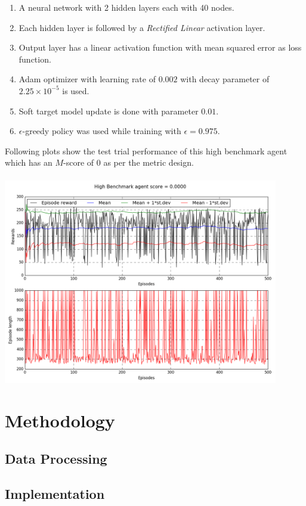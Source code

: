 \documentclass{article}
\begin{document}
\vspace{-0.1cm}
\begin{enumerate}
	\item A neural network with 2 hidden layers each with 40 nodes.
	\item Each hidden layer is followed by a \textit{Rectified Linear} activation layer.
	\item Output layer has a linear activation function with mean squared error as loss function.
	\item Adam optimizer with learning rate of $0.002$ with decay parameter of $2.25\times10^{-5}$ is used.
	\item Soft target model update is done with parameter $0.01$.
	\item $\epsilon$-greedy policy was used while training with $\epsilon = 0.975$.
\end{enumerate}
Following plots show the test trial performance of this high benchmark agent which has an $M$-score of $0$ as per the metric design.\\\\
\includegraphics[width=12cm,trim={0 0 0 0},clip]{img/highbenchmark_test_evaluation}\\
\section{Methodology}
\subsection*{Data Processing}
\subsection*{Implementation}
\end{document}
